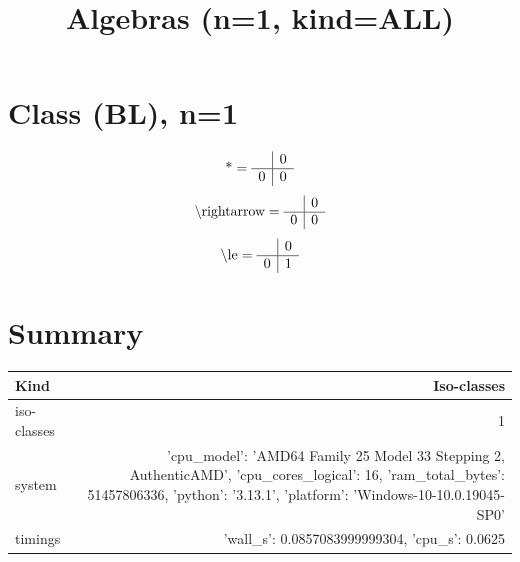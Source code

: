\documentclass[11pt]{article}
\title{Algebras (n=1, kind=ALL)}
\date{}
\begin{document}
\maketitle
\tableofcontents
\section{Class (BL), n=1}
\[\text{*} = 
\begin{array}{r | r}
 & 0 \\ \hline
0 & 0 \\
\end{array}
\]
\[\text{\textbackslash rightarrow} = 
\begin{array}{r | r}
 & 0 \\ \hline
0 & 0 \\
\end{array}
\]
\[\text{\textbackslash le} = 
\begin{array}{r | r}
 & 0 \\ \hline
0 & 1 \\
\end{array}
\]

\section*{Summary}
\begin{tabular}{lr}
\toprule
Kind & Iso-classes\\\midrule
iso-classes & 1\\
system & {'cpu_model': 'AMD64 Family 25 Model 33 Stepping 2, AuthenticAMD', 'cpu_cores_logical': 16, 'ram_total_bytes': 51457806336, 'python': '3.13.1', 'platform': 'Windows-10-10.0.19045-SP0'}\\
timings & {'wall_s': 0.0857083999999304, 'cpu_s': 0.0625}\\
\bottomrule
\end{tabular}
\end{document}
